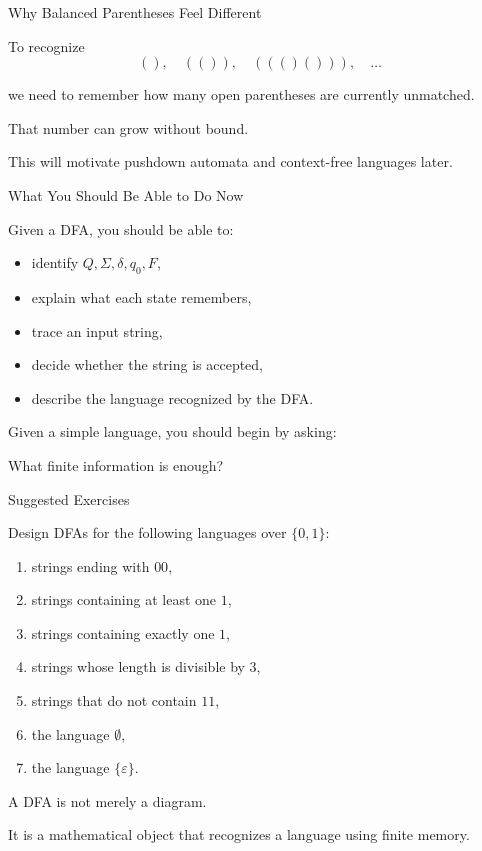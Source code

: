 \documentclass[10pt,aspectratio=169]{beamer}
\newcommand{\eps}{\varepsilon}
\begin{document}
\begin{frame}{Why Balanced Parentheses Feel Different}

To recognize
\[
(),\quad (()),\quad ((()())),\quad \ldots
\]

we need to remember how many open parentheses are currently unmatched.

\pause

That number can grow without bound.

\pause

This will motivate pushdown automata and context-free languages later.

\end{frame}

\begin{frame}{What You Should Be Able to Do Now}

Given a DFA, you should be able to:

\begin{itemize}
\item identify $Q,\Sigma,\delta,q_0,F$,
\item explain what each state remembers,
\item trace an input string,
\item decide whether the string is accepted,
\item describe the language recognized by the DFA.
\end{itemize}

\pause

Given a simple language, you should begin by asking:

\begin{center}
What finite information is enough?
\end{center}

\end{frame}

\begin{frame}{Suggested Exercises}

Design DFAs for the following languages over $\{0,1\}$:

\begin{enumerate}
\item strings ending with $00$,
\item strings containing at least one $1$,
\item strings containing exactly one $1$,
\item strings whose length is divisible by $3$,
\item strings that do not contain $11$,
\item the language $\emptyset$,
\item the language $\{\eps\}$.
\end{enumerate}

\end{frame}

\begin{frame}[standout]
A DFA is not merely a diagram.

It is a mathematical object that recognizes a language using finite memory.
\end{frame}

\end{document}
